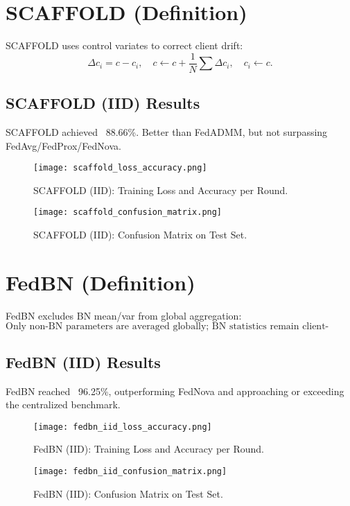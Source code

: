 \documentclass[12pt,a4paper]{report}
\begin{document}
\section{SCAFFOLD (Definition)}

SCAFFOLD uses control variates to correct client drift:
\[
\Delta c_i = c - c_i,\quad c \leftarrow c + \frac{1}{N}\sum \Delta c_i,\quad c_i \leftarrow c.
\]

\subsection{SCAFFOLD (IID) Results}

SCAFFOLD achieved ~88.66\%. Better than FedADMM, but not surpassing FedAvg/FedProx/FedNova.

\begin{figure}[H]
	\centering
	\texttt{[image: scaffold\_loss\_accuracy.png]}
	\caption{SCAFFOLD (IID): Training Loss and Accuracy per Round.}
\end{figure}

\begin{figure}[H]
	\centering
	\texttt{[image: scaffold\_confusion\_matrix.png]}
	\caption{SCAFFOLD (IID): Confusion Matrix on Test Set.}
\end{figure}

\section{FedBN (Definition)}

FedBN excludes BN mean/var from global aggregation:
\[
\text{Only non-BN parameters are averaged globally; BN statistics remain client-specific.}
\]

\subsection{FedBN (IID) Results}

FedBN reached ~96.25\%, outperforming FedNova and approaching or exceeding the centralized benchmark.

\begin{figure}[H]
	\centering
	\texttt{[image: fedbn\_iid\_loss\_accuracy.png]}
	\caption{FedBN (IID): Training Loss and Accuracy per Round.}
\end{figure}

\begin{figure}[H]
	\centering
	\texttt{[image: fedbn\_iid\_confusion\_matrix.png]}
	\caption{FedBN (IID): Confusion Matrix on Test Set.}
\end{figure}
\end{document}

